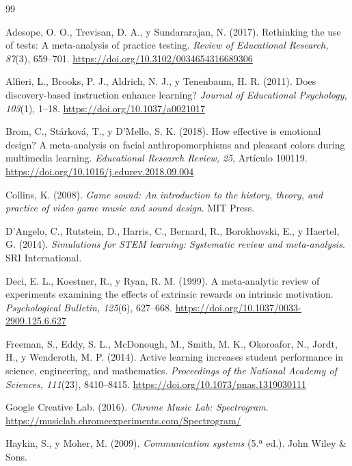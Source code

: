 \documentclass[conference]{IEEEtran}
\begin{document}
\renewcommand{\bibfont}{\footnotesize}
\begin{thebibliography}{99}

Adesope, O. O., Trevisan, D. A., y Sundararajan, N. (2017). Rethinking the use of tests: A meta-analysis of practice testing. \emph{Review of Educational Research, 87}(3), 659--701. \url{https://doi.org/10.3102/0034654316689306}

Alfieri, L., Brooks, P. J., Aldrich, N. J., y Tenenbaum, H. R. (2011). Does discovery-based instruction enhance learning? \emph{Journal of Educational Psychology, 103}(1), 1--18. \url{https://doi.org/10.1037/a0021017}

Brom, C., Stárková, T., y D'Mello, S. K. (2018). How effective is emotional design? A meta-analysis on facial anthropomorphisms and pleasant colors during multimedia learning. \emph{Educational Research Review, 25}, Artículo 100119. \url{https://doi.org/10.1016/j.edurev.2018.09.004}

Collins, K. (2008). \emph{Game sound: An introduction to the history, theory, and practice of video game music and sound design}. MIT Press.

D'Angelo, C., Rutstein, D., Harris, C., Bernard, R., Borokhovski, E., y Haertel, G. (2014). \emph{Simulations for STEM learning: Systematic review and meta-analysis}. SRI International.

Deci, E. L., Koestner, R., y Ryan, R. M. (1999). A meta-analytic review of experiments examining the effects of extrinsic rewards on intrinsic motivation. \emph{Psychological Bulletin, 125}(6), 627--668. \url{https://doi.org/10.1037/0033-2909.125.6.627}

Freeman, S., Eddy, S. L., McDonough, M., Smith, M. K., Okoroafor, N., Jordt, H., y Wenderoth, M. P. (2014). Active learning increases student performance in science, engineering, and mathematics. \emph{Proceedings of the National Academy of Sciences, 111}(23), 8410--8415. \url{https://doi.org/10.1073/pnas.1319030111}

Google Creative Lab. (2016). \emph{Chrome Music Lab: Spectrogram}. \url{https://musiclab.chromeexperiments.com/Spectrogram/}

Haykin, S., y Moher, M. (2009). \emph{Communication systems} (5.ª ed.). John Wiley \& Sons.


\end{thebibliography}
\end{document}
